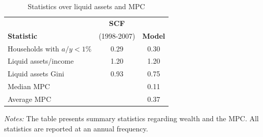 \documentclass[\latexroot/\projectname]{subfiles}
\begin{document}
\begin{table}[h]
  \centering
  \caption{Statistics over liquid assets and MPC\whenintegrated{\label{tab:qa-liquid-assets-mpc}}}
  \begin{tabular}{lcc}
    \hline
     & \textbf{SCF} &  \\
     \textbf{Statistic} & (1998-2007) & \textbf{Model} \\
    \hline
    Households with $a / y<1 \%$ & 0.29 & 0.30 \\
    Liquid assets/income & 1.20 & 1.20 \\
    Liquid assets Gini & 0.93 & 0.75 \\
    Median MPC &  & 0.11 \\
    Average MPC &  & 0.37 \\
    \hline
  \end{tabular}
  \begin{flushleft}
    \footnotesize
    \textit{Notes:} The table presents summary statistics regarding wealth and the MPC. All statistics are reported at an annual frequency.
  \end{flushleft}
\end{table}

\smartbib
\end{document}
